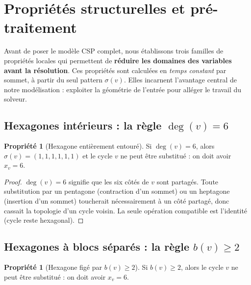 \documentclass[12pt,a4paper]{article}
\theoremstyle{definition}
\newtheorem{propriete}[definition]{Propri\'et\'e}
\theoremstyle{remark}
\newcommand{\xv}{x_v}
\newcommand{\degv}{\deg(v)}
\begin{document}
\section{Propri\'et\'es structurelles et pr\'e-traitement}
\label{sec:propstructurelles}

Avant de poser le mod\`ele CSP complet, nous \'etablissons trois familles
de propri\'et\'es \og locales \fg{} qui permettent de \textbf{r\'eduire
les domaines des variables avant la r\'esolution}. Ces propri\'et\'es
sont calcul\'ees en \emph{temps constant} par sommet, \`a partir du seul
pattern $\sigma(v)$. Elles incarnent l'avantage central de notre
mod\'elisation : exploiter la g\'eom\'etrie de l'entr\'ee pour all\'eger
le travail du solveur.

\subsection{Hexagones int\'erieurs : la r\`egle $\degv = 6$}

\begin{propriete}[Hexagone enti\`erement entour\'e]
\label{prop:degre6}
Si $\degv = 6$, alors $\sigma(v) = (1,1,1,1,1,1)$ et le cycle $v$ ne peut
\^etre substitu\'e : on doit avoir $\xv = 6$.
\end{propriete}

\begin{proof}
$\degv = 6$ signifie que les six c\^ot\'es de $v$ sont partag\'es. Toute
substitution par un pentagone (contraction d'un sommet) ou un heptagone
(insertion d'un sommet) toucherait n\'ecessairement \`a un c\^ot\'e
partag\'e, donc cassait la topologie d'un cycle voisin. La seule
op\'eration compatible est l'identit\'e (cycle reste hexagonal).
\end{proof}

\subsection{Hexagones \`a blocs s\'epar\'es : la r\`egle $b(v) \geq 2$}

\begin{propriete}[Hexagone fig\'e par $b(v) \geq 2$]
\label{prop:b2}
Si $b(v) \geq 2$, alors le cycle $v$ ne peut \^etre substitu\'e : on doit
avoir $\xv = 6$.
\end{propriete}
\end{document}
